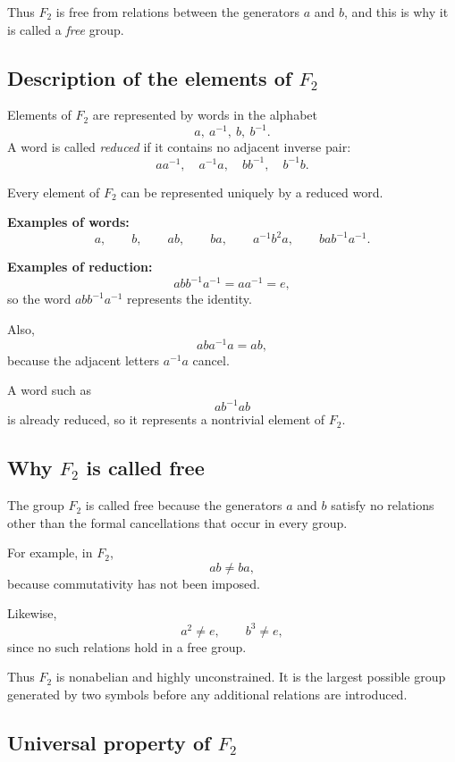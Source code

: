\documentclass[12pt,a4paper]{article}
\theoremstyle{notespace}
\begin{document}
Thus \(F_2\) is free from relations between the generators \(a\) and \(b\), and this is why it is called a \emph{free} group.

\bigskip

\subsection{Description of the elements of \texorpdfstring{$F_2$}{F2}}

Elements of \(F_2\) are represented by words in the alphabet
\[
a,\ a^{-1},\ b,\ b^{-1}.
\]
A word is called \emph{reduced} if it contains no adjacent inverse pair:
\[
aa^{-1},\quad a^{-1}a,\quad bb^{-1},\quad b^{-1}b.
\]

Every element of \(F_2\) can be represented uniquely by a reduced word.

\medskip

\textbf{Examples of words:}
\[
a,\qquad b,\qquad ab,\qquad ba,\qquad a^{-1}b^2a,\qquad bab^{-1}a^{-1}.
\]

\textbf{Examples of reduction:}
\[
abb^{-1}a^{-1}=aa^{-1}=e,
\]
so the word \(abb^{-1}a^{-1}\) represents the identity.

Also,
\[
aba^{-1}a=ab,
\]
because the adjacent letters \(a^{-1}a\) cancel.

A word such as
\[
ab^{-1}ab
\]
is already reduced, so it represents a nontrivial element of \(F_2\).

\bigskip

\subsection{Why \texorpdfstring{$F_2$}{F2} is called free}

The group \(F_2\) is called free because the generators \(a\) and \(b\) satisfy no relations other than the formal cancellations that occur in every group.

For example, in \(F_2\),
\[
ab\neq ba,
\]
because commutativity has not been imposed.

Likewise,
\[
a^2\neq e,\qquad b^3\neq e,
\]
since no such relations hold in a free group.

Thus \(F_2\) is nonabelian and highly unconstrained. It is the largest possible group generated by two symbols before any additional relations are introduced.

\bigskip

\subsection{Universal property of \texorpdfstring{$F_2$}{F2}}
\end{document}
